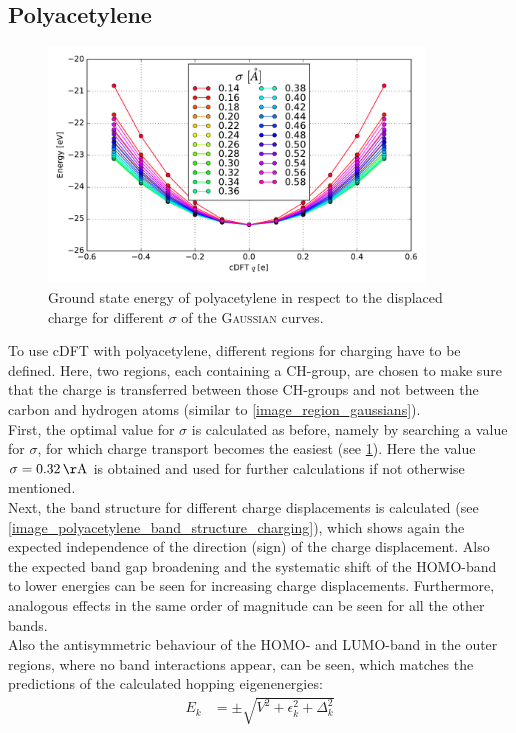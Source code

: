 \subsection{Polyacetylene}
\begin{figure}[]
	\centering
	\includegraphics[width = 10cm]{Images/polyacetylene/charging/sigmas}
	\caption{Ground state energy of polyacetylene in respect to the displaced charge for different $\sigma$ of the \textsc{Gaussian} curves.}
	\label{image_sigmas_polyacetylene}
\end{figure}
To use cDFT with polyacetylene, different regions for charging have to be defined. Here, two regions, each containing a CH-group, are chosen to make sure that the charge is transferred between those CH-groups and not between the carbon and hydrogen atoms (similar to \cref{image_region_gaussians}).\\
First, the optimal value for $\sigma$ is calculated as before, namely by searching a value for $\sigma$, for which charge transport becomes the easiest (see \cref{image_sigmas_polyacetylene}). Here the value $\sigma = \unit[0.32]{\AA}$ is obtained and used for further calculations if not otherwise mentioned.\\
Next, the band structure for different charge displacements is calculated (see \cref{image_polyacetylene_band_structure_charging}), which shows again the expected independence of the direction (sign) of the charge displacement. Also the expected band gap broadening and the systematic shift of the HOMO-band to lower energies can be seen for increasing charge displacements. Furthermore, analogous effects in the same order of magnitude can be seen for all the other bands.\\
Also the antisymmetric behaviour of the HOMO- and LUMO-band in the outer regions, where no band interactions appear, can be seen, which matches the predictions of the calculated hopping eigenenergies:
\begin{align}
	E_k &= \pm \sqrt{V^2+\epsilon_k^2+\Delta_k^2}
\end{align}

